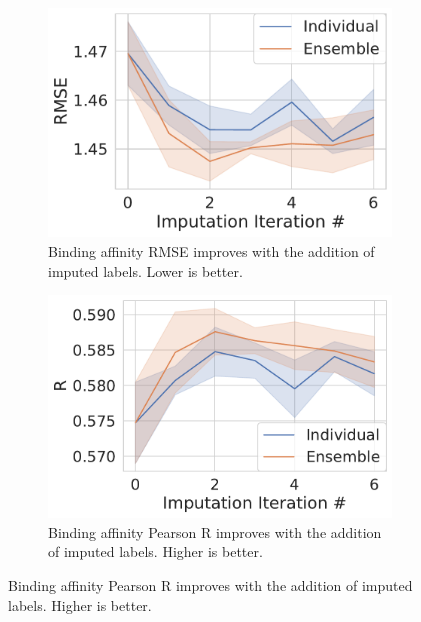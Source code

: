 \documentclass[journal=jmcmar,manuscript=article]{achemso}
\begin{document}
\begin{figure}[tbph]
    \centering
    \begin{subfigure}[t]{0.48\textwidth}
        \centering
        \includegraphics[width=\linewidth]{figures/InitialImpRMSE.pdf}
        \caption{Binding affinity RMSE improves with the addition of imputed labels. Lower is better.}
    \end{subfigure}
    \hfill
    \begin{subfigure}[t]{0.48\textwidth}
        \centering
        \includegraphics[width=\linewidth]{figures/InitialImpR.pdf}
        \caption{Binding affinity Pearson R improves with the addition of imputed labels. Higher is better.}
    \end{subfigure}


\end{figure}
\end{document}
